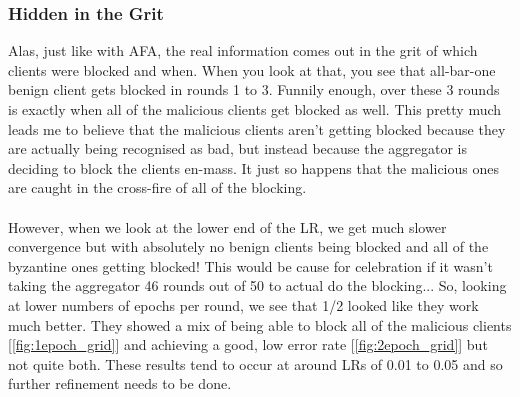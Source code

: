 \subsubsection{Hidden in the Grit}

Alas, just like with AFA, the real information comes out in the grit of which clients were blocked and when.
When you look at that, you see that all-bar-one benign client gets blocked in rounds 1 to 3.
Funnily enough, over these 3 rounds is exactly when all of the malicious clients get blocked as well.
This pretty much leads me to believe that the malicious clients aren't getting blocked because they are actually being recognised as bad, but instead because the aggregator is deciding to block the clients en-mass.
It just so happens that the malicious ones are caught in the cross-fire of all of the blocking.
\\ \\
However, when we look at the lower end of the LR, we get much slower convergence but with absolutely no benign clients being blocked and all of the byzantine ones getting blocked!
This would be cause for celebration if it wasn't taking the aggregator 46 rounds out of 50 to actual do the blocking...
So, looking at lower numbers of epochs per round, we see that 1/2 looked like they work much better.
They showed a mix of being able to block all of the malicious clients [\ref{fig:1epoch_grid}] and achieving a good, low error rate [\ref{fig:2epoch_grid}] but not quite both.
These results tend to occur at around LRs of 0.01 to 0.05 and so further refinement needs to be done.

